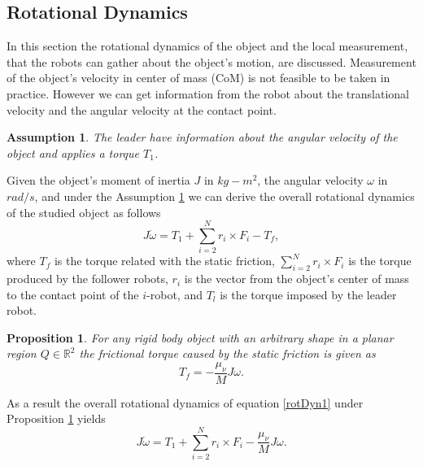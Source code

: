 \documentclass[letterpaper, 10 pt, conference]{ieeeconf}
\newtheorem{assumption}{\textbf{Assumption}}
\newtheorem{proposition}{\textbf{Proposition}}
\begin{document}
\subsection{Rotational Dynamics}\label{rd}
In this section the rotational dynamics of the object and the local measurement, that the robots can gather about the object's motion, are discussed. Measurement of the object's velocity in center of mass (CoM) is not feasible to be taken in practice. However we can get information from the robot about the translational velocity and the angular velocity at the contact point. \vspace{.2cm}
\begin{assumption}\label{as2}
\textit{The leader have information about the angular velocity of the object and applies a torque $T_1$.} \vspace{.2cm}
\end{assumption}
Given the object's moment of inertia $J$ in $kg-m^2$, the angular velocity $\omega$ in $rad/s$, and under the Assumption \ref{as2} we can derive the overall rotational dynamics of the studied object as follows
\begin{equation}\label{rotDyn1}
J\dot{\omega}=T_1 +\sum_{i=2}^{N}r_i\times F_i-T_f,
\end{equation}
where $T_f$ is the torque related with the static friction, $\sum_{i=2}^{N}r_i\times F_i$ is the torque produced by the follower robots, $r_i$ is the vector from the object's center of mass to the contact point of the $i$-robot,  and $T_l$ is the torque imposed by the leader robot.\vspace{.2cm}
\begin{proposition}\label{pr1}
\textit{For any rigid body object with an arbitrary shape in a planar region $Q \in \mathbb{R}^2$ the frictional torque caused by the static friction is given as}
\begin{equation}
T_f=-\frac{\mu_{\nu}}{M}J\omega.
\end{equation} \vspace{.2cm}
\end{proposition}
As a result the overall rotational dynamics of equation \ref{rotDyn1} under Proposition \ref{pr1} yields
\begin{equation}\label{rotDyn2}
J\dot{\omega}=T_1 +\sum_{i=2}^{N}r_i\times F_i-\frac{\mu_{\nu}}{M}J\omega.
\end{equation}
\end{document}
